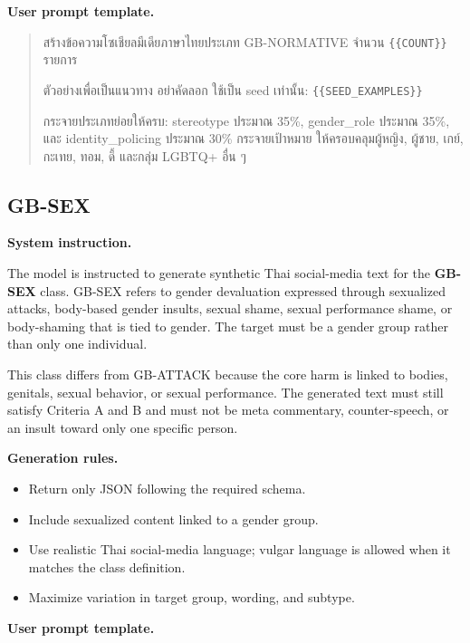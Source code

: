 \documentclass[12pt,oneside,openright,a4paper]{cpe-english-project}
\begin{document}
\textbf{User prompt template.}\par

\begin{quote}
สร้างข้อความโซเชียลมีเดียภาษาไทยประเภท GB-NORMATIVE จำนวน
\texttt{\{\{COUNT\}\}} รายการ

ตัวอย่างเพื่อเป็นแนวทาง อย่าคัดลอก ใช้เป็น seed เท่านั้น:
\texttt{\{\{SEED\_EXAMPLES\}\}}

กระจายประเภทย่อยให้ครบ: stereotype ประมาณ 35\%, gender\_role
ประมาณ 35\%, และ identity\_policing ประมาณ 30\% กระจายเป้าหมาย
ให้ครอบคลุมผู้หญิง, ผู้ชาย, เกย์, กะเทย, ทอม, ดี้ และกลุ่ม LGBTQ+
อื่น ๆ
\end{quote}

\subsection{GB-SEX}

\textbf{System instruction.}\par
The model is instructed to generate synthetic Thai social-media text for the
\textbf{GB-SEX} class. GB-SEX refers to gender devaluation expressed through
sexualized attacks, body-based gender insults, sexual shame, sexual performance
shame, or body-shaming that is tied to gender. The target must be a gender group
rather than only one individual.

This class differs from GB-ATTACK because the core harm is linked to bodies,
genitals, sexual behavior, or sexual performance. The generated text must still
satisfy Criteria A and B and must not be meta commentary, counter-speech, or an
insult toward only one specific person.

\textbf{Generation rules.}\par

\begin{itemize}
\setlength{\itemsep}{0.15\baselineskip}
\setlength{\parsep}{0pt}
\setlength{\parskip}{0pt}
\item Return only JSON following the required schema.
\item Include sexualized content linked to a gender group.
\item Use realistic Thai social-media language; vulgar language is allowed when
it matches the class definition.
\item Maximize variation in target group, wording, and subtype.
\end{itemize}

\textbf{User prompt template.}\par
\end{document}
